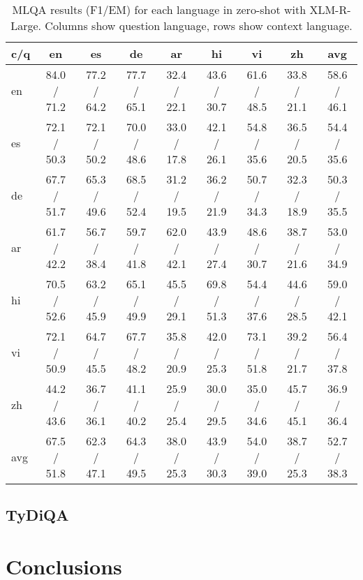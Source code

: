 \documentclass[11pt]{article}
\begin{document}
\begin{table*}[!ht]
    \centering
    \begin{adjustbox}{max width=\textwidth}
    \begin{tabular}{l|ccccccc|c}
    \toprule
        c/q & en & es & de & ar & hi & vi & zh & avg \\ \midrule
        en & 84.0 / 71.2 & 77.2 / 64.2 & 77.7 / 65.1 & 32.4 / 22.1 & 43.6 / 30.7 & 61.6 / 48.5 & 33.8 / 21.1 & 58.6 / 46.1 \\ 
        es & 72.1 / 50.3 & 72.1 / 50.2 & 70.0 / 48.6 & 33.0 / 17.8 & 42.1 / 26.1 & 54.8 / 35.6 & 36.5 / 20.5 & 54.4 / 35.6 \\ 
        de & 67.7 / 51.7 & 65.3 / 49.6 & 68.5 / 52.4 & 31.2 / 19.5 & 36.2 / 21.9 & 50.7 / 34.3 & 32.3 / 18.9 & 50.3 / 35.5 \\ 
        ar & 61.7 / 42.2 & 56.7 / 38.4 & 59.7 / 41.8 & 62.0 / 42.1 & 43.9 / 27.4 & 48.6 / 30.7 & 38.7 / 21.6 & 53.0 / 34.9 \\ 
        hi & 70.5 / 52.6 & 63.2 / 45.9 & 65.1 / 49.9 & 45.5 / 29.1 & 69.8 / 51.3 & 54.4 / 37.6 & 44.6 / 28.5 & 59.0 / 42.1 \\ 
        vi & 72.1 / 50.9 & 64.7 / 45.5 & 67.7 / 48.2 & 35.8 / 20.9 & 42.0 / 25.3 & 73.1 / 51.8 & 39.2 / 21.7 & 56.4 / 37.8 \\ 
        zh & 44.2 / 43.6 & 36.7 / 36.1 & 41.1 / 40.2 & 25.9 / 25.4 & 30.0 / 29.5 & 35.0 / 34.6 & 45.7 / 45.1 & 36.9 / 36.4 \\ \midrule
        avg & 67.5 / 51.8 & 62.3 / 47.1 & 64.3 / 49.5 & 38.0 / 25.3 & 43.9 / 30.3 & 54.0 / 39.0 & 38.7 / 25.3 & 52.7 / 38.3 \\ \bottomrule
    \end{tabular}
    \end{adjustbox}
    \caption{MLQA results (F1/EM) for each language in zero-shot with XLM-R-Large. Columns show question language, rows show context language.}
    \label{MLQA_results_ZS_XLM-R-Large}
\end{table*}





\subsection{TyDiQA}

\section{Conclusions}



\end{document}
